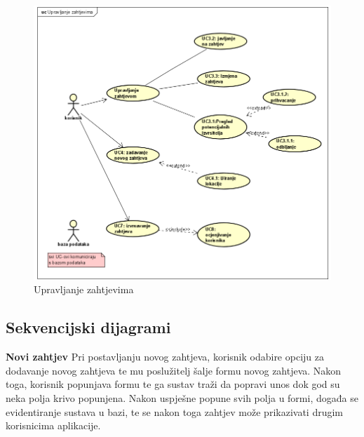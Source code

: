 					\begin{figure}[H]
					\includegraphics[scale=0.7]{slike/upravljanje-zahtjevima.png} %
					\centering
					\caption{Upravljanje zahtjevima}
				\end{figure}
				\newpage
				
				
				\eject		
				
			\subsection{Sekvencijski dijagrami}
				
				\noindent \large {\textbf{Novi zahtjev}}
				\newline
				\noindent \normalsize Pri postavljanju novog zahtjeva, korisnik odabire opciju za dodavanje novog zahtjeva te mu poslužitelj šalje formu novog zahtjeva. Nakon toga, korisnik popunjava formu te ga sustav traži da popravi unos dok god su neka polja krivo popunjena. Nakon uspješne popune svih polja u formi, događa se evidentiranje sustava u bazi, te se nakon toga zahtjev može prikazivati drugim korisnicima aplikacije. 
				   
